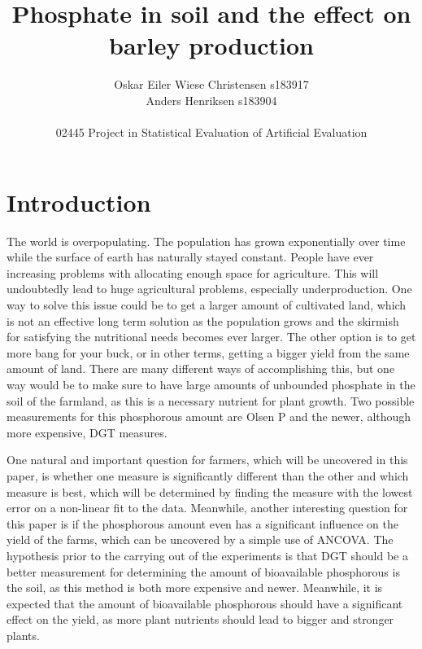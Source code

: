 \documentclass[11pt, fleqn, titlepage]{article}
\title{Phosphate in soil and the effect on barley production}
\author{Oskar Eiler Wiese Christensen s183917 \\ Anders Henriksen s183904 \\ \\ 02445 Project in Statistical Evaluation of Artificial Evaluation}
\date{\today \vspace{2.5cm} \section*{\small Summary} 
\justify{\footnotesize Farmers will need more effective agriculture as the population grows. This can be accomplished by optimizing the amount of bioavailable phosphorous in the soil. The purpose of this paper is to analyze two different measurements of phosphorous in the soil. The measurements are OlsenP and DGT. Furthermore, it is studied which measurement is better at describing the yield. A linear and non-linear Michaelis-Mentel model have been fit to the data to find the best possible measurement to use, and ANCOVA has been applied for finding the significance of phosphorous for the yield. These analyses have shown that DGT is the best of the two measurements and that phosphorous has a remarkably significant influence on the harvest yield. This shows that phosphorous measurements can be constructive in helping farmers estimate the yield. Meanwhile, when estimating this, DGT is the better of the measurements, though it also costs more, so farmers should take into consideration the cost-benefit of using DGT instead of OlsenP.}}
\begin{document}
\maketitle

\section{Introduction}
The world is overpopulating. The population has grown exponentially over time while the surface of earth has naturally stayed constant. People have ever increasing problems with allocating enough space for agriculture. This will undoubtedly lead to huge agricultural problems, especially underproduction. One way to solve this issue could be to get a larger amount of cultivated land, which is not an effective long term solution as the population grows and the skirmish for satisfying the nutritional needs becomes ever larger. The other option is to get more bang for your buck, or in other terms, getting a bigger yield from the same amount of land. There are many different ways of accomplishing this, but one way would be to make sure to have large amounts of unbounded phosphate in the soil of the farmland, as this is a necessary nutrient for plant growth. Two possible measurements for this phosphorous amount are Olsen P and the newer, although more expensive, DGT measures. 

One natural and important question for farmers, which will be uncovered in this paper, is whether one measure is significantly different than the other and which measure is best, which will be determined by finding the measure with the lowest error on a non-linear fit to the data. Meanwhile, another interesting question for this paper is if the phosphorous amount even has a significant influence on the yield of the farms, which can be uncovered by a simple use of ANCOVA. The hypothesis prior to the carrying out of the experiments is that DGT should be a better measurement for determining the amount of bioavailable phosphorous is the soil, as this method is both more expensive and newer. Meanwhile, it is expected that the amount of bioavailable phosphorous should have a significant effect on the yield, as more plant nutrients should lead to bigger and stronger plants.
\end{document}
